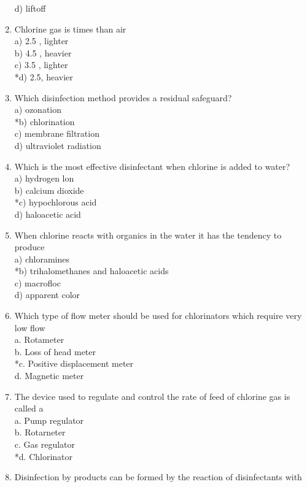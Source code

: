 \begin{enumerate}[1.]
d) liftoff\\
\item Chlorine gas is times than air\\
a) 2.5 , lighter\\
b) 4.5 , heavier\\
c) 3.5 , lighter\\
*d) 2.5, heavier\\
\item Which disinfection method provides a residual safeguard?\\
a) ozonation\\
*b) chlorination\\
c) membrane filtration\\
d) ultraviolet radiation\\
\item Which is the most effective disinfectant when chlorine is added to water?\\
a) hydrogen lon\\
b) calcium dioxide\\
*c) hypochlorous acid\\
d) haloacetic acid\\
\item When chlorine reacts with organics in the water it has the tendency to produce\\
a) chloramines\\
*b) trihalomethanes and haloacetic acids\\
c) macrofloc\\
d) apparent color\\
\item Which type of flow meter should be used for chlorinators which require very low flow\\
a.  Rotameter\\
b.  Loss of head meter\\
*c.  Positive displacement meter\\
d.  Magnetic meter\\
\item The device used to regulate and control the rate of feed of chlorine gas is called a\\
a.  Pump regulator\\
b.  Rotarneter\\
c.  Gas regulator\\
*d.  Chlorinator\\
\item Disinfection by products can be formed by the reaction of disinfectants with\\

\end{enumerate}
